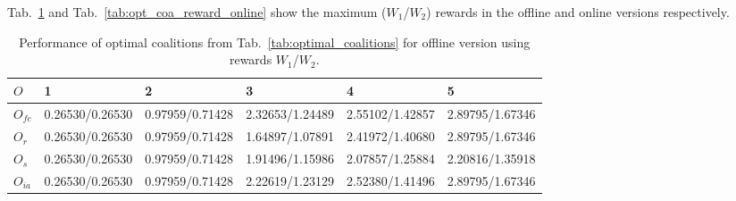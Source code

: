 \documentclass{llncs}
\begin{document}
\begin{table}
 \centering
{}

\caption{Values for maximum probabilities to complete both tasks for coalitions from Tab.~\ref{tab:optimal_coalitions}.} \label{tab:optimal_2task}
\end{table}



Tab.~\ref{tab:opt_coa_reward_offline} and Tab.~\ref{tab:opt_coa_reward_online} show the maximum ($W_1$/$W_2$) rewards in the offline and online versions respectively.


\begin{table}
 \centering
 \begin{tabular}{ | l | l | l | l | l | l |}
    \hline
    $O$ & 1& 2 & 3 & 4 & 5 \\ \hline
    $O_{\mathit{fc}}$ & 0.26530/0.26530  & 0.97959/0.71428  &  2.32653/1.24489  &  2.55102/1.42857   &  2.89795/1.67346  \\ \hline
    $O_r$ &  0.26530/0.26530   & 0.97959/0.71428  &  1.64897/1.07891  &  2.41972/1.40680   &  2.89795/1.67346 \\ \hline
    $O_s$ &  0.26530/0.26530   &  0.97959/0.71428  & 1.91496/1.15986  &  2.07857/1.25884   &  2.20816/1.35918  \\ \hline
    $O_{ia}$ & 0.26530/0.26530   &  0.97959/0.71428  &  2.22619/1.23129  &  2.52380/1.41496   &  2.89795/1.67346  \\ \hline
\end{tabular}
\caption{Performance of optimal coalitions from Tab.~\ref{tab:optimal_coalitions} for offline version using rewards $W_1$/$W_2$.}
\label{tab:opt_coa_reward_offline}
\end{table}
\end{document}
